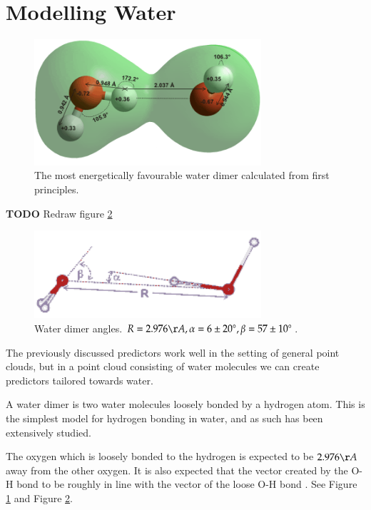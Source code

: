 \documentclass[a4paper]{report}
\newcommand{\degree}{\ensuremath{^\circ}}
\newcommand{\todo}{\textbf{TODO} }
\begin{document}
\section{Modelling Water}
\label{sec:modelling-water}

\begin{figure}[h]
  \centering
  \includegraphics[width=0.75\textwidth]{images/h402}
  \caption{The most energetically favourable water dimer calculated from first
    principles. \citep{watermolecule}}
  \label{fig:dimer}
\end{figure}

\todo Redraw figure \ref{fig:dimer-angle}
\begin{figure}[h]
  \centering
  \includegraphics[width=0.75\textwidth]{images/dimr}
  \caption{Water dimer angles. $R = 2.976\AA, \alpha = 6 \pm 20\degree, \beta =
    57 \pm 10\degree$. \citep{watermolecule}}
  \label{fig:dimer-angle}
\end{figure}

The previously discussed predictors work well in the setting of general point
clouds, but in a point cloud consisting of water molecules we can create
predictors tailored towards water.

A water dimer is two water molecules loosely bonded by a hydrogen atom. This
is the simplest model for hydrogen bonding in water, and as such has been
extensively studied.

The oxygen which is loosely bonded to the hydrogen is expected to be
$2.976\AA$ away from the other oxygen. It is also expected that the vector
created by the O-H bond to be roughly in line with the vector of the loose O-H
bond \citep{watermolecule}. See Figure \ref{fig:dimer} and Figure
\ref{fig:dimer-angle}.
\end{document}

